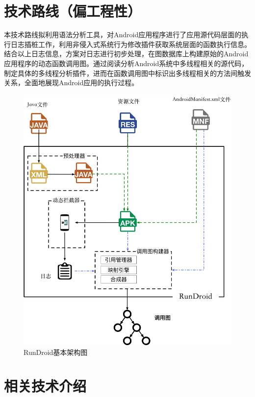 \section{技术路线（偏工程性）}
本技术路线拟利用语法分析工具，对Android应用程序进行了应用源代码层面的执行日志插桩工作，利用非侵入式系统行为修改插件获取系统层面的函数执行信息。结合以上日志信息，方案对日志进行初步处理，在图数据库上构建原始的Android应用程序的动态函数调用图。通过阅读分析Android系统中多线程相关的源代码，制定具体的多线程分析插件，进而在函数调用图中标识出多线程相关的方法间触发关系，全面地展现Android应用的执行过程。
 
 
\begin{figure}[h]
\centering
\includegraphics[height=0.5\textheight]{./Figures/rundroid-overview.png}
\caption{ RunDroid基本架构图}
\label{fig:rundroid_overview}
\end{figure}


\section{相关技术介绍}

